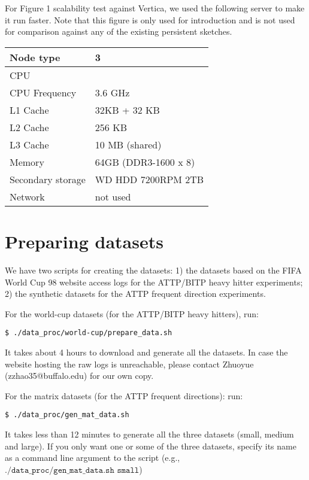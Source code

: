 \documentclass[11pt]{article}
\begin{document}
For Figure 1 scalability test against Vertica, we used the following
server to make it run faster. Note that this figure is only used for
introduction and is not used for comparison against any of the
existing persistent sketches.

\vspace{1mm}
\begin{tabular}{|l|l|}
    \hline
	Node type &  3 \\\hline
	CPU & \\\hline
	CPU Frequency & 3.6 GHz \\\hline
	L1 Cache & 32KB + 32 KB \\\hline
	L2 Cache & 256 KB \\\hline
	L3 Cache & 10 MB (shared)  \\\hline
	Memory & 64GB (DDR3-1600 x 8)  \\\hline
	Secondary storage & WD HDD 7200RPM 2TB \\\hline
	Network & not used \\\hline
\end{tabular}
\vspace{1mm}


\section{Preparing datasets}

We have two scripts for creating the datasets: 1) the datasets based
on the FIFA World Cup 98 website access logs for the ATTP/BITP heavy
hitter experiments; 2) the synthetic datasets for the ATTP
frequent direction experiments. 

For the world-cup datasets (for the ATTP/BITP heavy hitters), run:
\begin{verbatim}
$ ./data_proc/world-cup/prepare_data.sh
\end{verbatim}
It takes about 4 hours to download and generate all the datasets. In
case the website hosting the raw logs is unreachable, please contact
Zhuoyue (zzhao35@buffalo.edu) for our own copy.

For the matrix datasets (for the ATTP frequent directions): run:
\begin{verbatim}
$ ./data_proc/gen_mat_data.sh
\end{verbatim}
It takes less than 12 minutes to generate all the three datasets (small,
medium and large). If you only want one or some of the three datasets,
specify its name as a command line argument to the script (e.g.,
$\texttt{./data\_proc/gen\_mat\_data.sh small}$)
\end{document}
